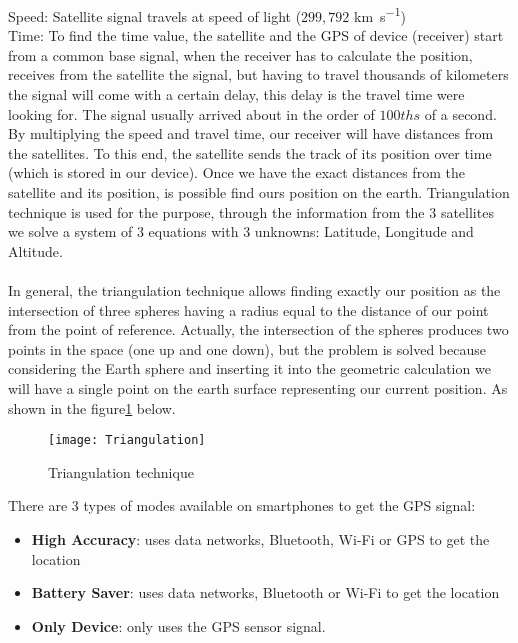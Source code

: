 \documentclass[tesi]{subfiles}
\begin{document}
\noindent Speed: Satellite signal travels at speed of light ($299,792$ \si{\km\per\second})\\
Time: To find the time value, the satellite and the GPS of device (receiver) start from a common base signal, when the receiver has to calculate the position, receives from the satellite the signal, but having to travel thousands of kilometers the signal will come with a certain delay, this delay is the travel time were looking for. The signal usually arrived about in the order of $100ths$ of a second.
By multiplying the speed and travel time, our receiver will have distances from the satellites. To this end, the satellite sends the track of its position over time (which is stored in our device). Once we have the exact distances from the satellite and its position, is possible find ours position on the earth. Triangulation technique is used for the purpose, through the information from the 3 satellites we solve a system of 3 equations with 3 unknowns: Latitude, Longitude and Altitude.\\\\
\noindent In general, the triangulation technique allows finding exactly our position as the intersection of three spheres having a radius equal to the distance of our point from the point of reference. Actually, the intersection of the spheres produces two points in the space (one up and one down), but the problem is solved because considering the Earth sphere and inserting it into the geometric calculation we will have a single point on the earth surface representing our current position. As shown in the figure\ref{fig:Triangulation technique} below.

\begin{figure}[H]
\centering
\texttt{[image: Triangulation]}
\caption{Triangulation technique}
\label{fig:Triangulation technique}
\end{figure}
\vspace{0.5cm}

There are 3 types of modes available on smartphones to get the GPS signal: 
\begin{itemize}
\item \textbf{High Accuracy}: uses data networks, Bluetooth, Wi-Fi or GPS to get the location
\item \textbf{Battery Saver}: uses data networks, Bluetooth or Wi-Fi to get the location
\item \textbf{Only Device}:  only uses the GPS sensor signal.
\end{itemize}
\end{document}
